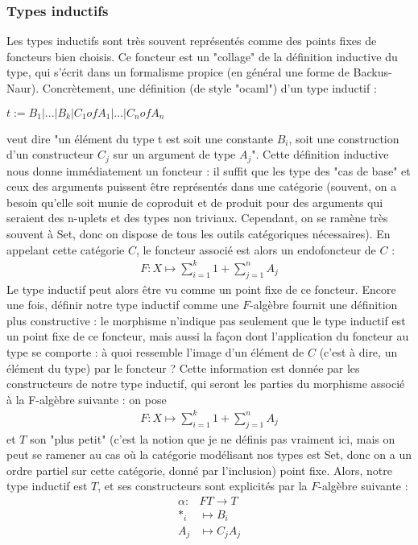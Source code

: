 \documentclass{article}
\begin{document}
\subsubsection{Types inductifs}

Les types inductifs sont très souvent représentés comme des points fixes de foncteurs bien choisis. Ce foncteur est un "collage" de la définition inductive du type, qui s'écrit dans un formalisme propice (en général une forme de Backus-Naur). Concrètement,  une définition (de style "ocaml") d'un type inductif : 
\begin{center}
    $  t := B_1 | ... | B_k | C_1 of A_1 | ... | C_n of A_n $
\end{center}
veut dire "un élément du type t est soit une constante $B_i$, soit une construction d'un constructeur $C_j$ sur un argument de type $A_j$". Cette définition inductive nous donne immédiatement un foncteur : il suffit que les type des "cas de base" et ceux des arguments puissent être représentés dans une catégorie (souvent, on a besoin qu'elle soit munie de coproduit et de produit pour des arguments qui seraient des n-uplets et des types non triviaux. Cependant, on se ramène très souvent à Set, donc on dispose de tous les outils catégoriques nécessaires). En appelant cette catégorie $C$, le foncteur  associé est alors  un endofoncteur de $C$ : 
\begin{align*}
    F : X \mapsto \sum_{i=1}^k 1 + \sum_{j=1}^n A_j
\end{align*}
Le type inductif peut alors être vu comme un point fixe de ce foncteur. Encore une fois, définir notre type inductif comme une $F$-algèbre fournit une définition plus constructive : le morphisme n'indique pas seulement que le type inductif est un point fixe de ce foncteur, mais aussi la façon dont l'application du foncteur au type se comporte : à quoi ressemble l'image d'un élément de $C$ (c'est à dire, un élément du type) par le foncteur ? Cette information est donnée par les constructeurs de notre type inductif, qui seront les parties du morphisme associé à la F-algèbre suivante : on pose \begin{align*}
    F : X \mapsto \sum_{i=1}^k 1 + \sum_{j=1}^n A_j
\end{align*}  et $T$ son "plus petit" (c'est la notion que je ne définis pas vraiment ici, mais on peut se ramener au cas où la catégorie modélisant nos types est Set, donc on a un ordre partiel sur cette catégorie, donné par l'inclusion) point fixe. Alors, notre type inductif est $T$, et ses constructeurs sont explicités par la $F$-algèbre suivante : 
\begin{align*}
    \alpha : & F T \rightarrow T  \\ 
    *_i & \mapsto B_i \\ 
    A_j & \mapsto C_j A_j
\end{align*}
\end{document}

